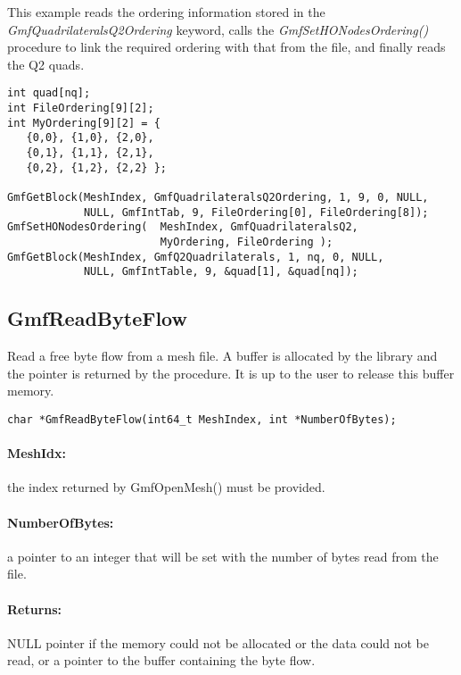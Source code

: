 \documentclass[a4paper,12pt]{article}
\begin{document}
This example reads the ordering information stored in the \emph{GmfQuadrilateralsQ2Ordering} keyword, calls the \emph{GmfSetHONodesOrdering()} procedure to link the required ordering with that from the file, and finally reads the Q2 quads.

\begin{tt}
\begin{verbatim}
int quad[nq];
int FileOrdering[9][2];
int MyOrdering[9][2] = {
   {0,0}, {1,0}, {2,0},
   {0,1}, {1,1}, {2,1},
   {0,2}, {1,2}, {2,2} };

GmfGetBlock(MeshIndex, GmfQuadrilateralsQ2Ordering, 1, 9, 0, NULL,
            NULL, GmfIntTab, 9, FileOrdering[0], FileOrdering[8]);
GmfSetHONodesOrdering(  MeshIndex, GmfQuadrilateralsQ2,
                        MyOrdering, FileOrdering );
GmfGetBlock(MeshIndex, GmfQ2Quadrilaterals, 1, nq, 0, NULL,
            NULL, GmfIntTable, 9, &quad[1], &quad[nq]);
\end{verbatim}
\end{tt}
\normalfont


\subsection{GmfReadByteFlow}
Read a free byte flow from a mesh file.
A buffer is allocated by the library and the pointer is returned by the procedure.
It is up to the user to release this buffer memory.

\begin{tt}
\begin{verbatim}
char *GmfReadByteFlow(int64_t MeshIndex, int *NumberOfBytes);
\end{verbatim}
\end{tt}
\normalfont

\paragraph{MeshIdx:}
the index returned by GmfOpenMesh() must be provided.

\paragraph{NumberOfBytes:} a pointer to an integer that will be set with the number of bytes read from the file.

\paragraph{Returns:} NULL pointer if the memory could not be allocated or the data could not be read, or a pointer to the buffer containing the byte flow.
\end{document}
